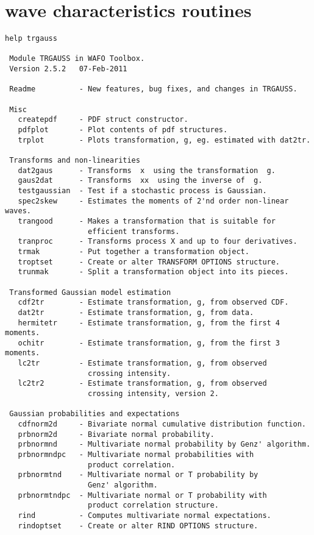 
\newpage
\section{\progname{} wave characteristics routines}
\label{s:waveroutines}

{\small\begin{verbatim}
help trgauss

 Module TRGAUSS in WAFO Toolbox.
 Version 2.5.2   07-Feb-2011

 Readme          - New features, bug fixes, and changes in TRGAUSS.

 Misc
   createpdf     - PDF struct constructor.
   pdfplot       - Plot contents of pdf structures.
   trplot        - Plots transformation, g, eg. estimated with dat2tr.

 Transforms and non-linearities
   dat2gaus      - Transforms  x  using the transformation  g.
   gaus2dat      - Transforms  xx  using the inverse of  g.
   testgaussian  - Test if a stochastic process is Gaussian.
   spec2skew     - Estimates the moments of 2'nd order non-linear waves.
   trangood      - Makes a transformation that is suitable for
                   efficient transforms.
   tranproc      - Transforms process X and up to four derivatives.
   trmak         - Put together a transformation object.
   troptset      - Create or alter TRANSFORM OPTIONS structure.
   trunmak       - Split a transformation object into its pieces.

 Transformed Gaussian model estimation
   cdf2tr        - Estimate transformation, g, from observed CDF.
   dat2tr        - Estimate transformation, g, from data.
   hermitetr     - Estimate transformation, g, from the first 4 moments.
   ochitr        - Estimate transformation, g, from the first 3 moments.
   lc2tr         - Estimate transformation, g, from observed
                   crossing intensity.
   lc2tr2        - Estimate transformation, g, from observed
                   crossing intensity, version 2.

 Gaussian probabilities and expectations
   cdfnorm2d     - Bivariate normal cumulative distribution function.
   prbnorm2d     - Bivariate normal probability.
   prbnormnd     - Multivariate normal probability by Genz' algorithm.
   prbnormndpc   - Multivariate normal probabilities with
                   product correlation.
   prbnormtnd    - Multivariate normal or T probability by
                   Genz' algorithm.
   prbnormtndpc  - Multivariate normal or T probability with
                   product correlation structure.
   rind          - Computes multivariate normal expectations.
   rindoptset    - Create or alter RIND OPTIONS structure.


\end{verbatim}}
